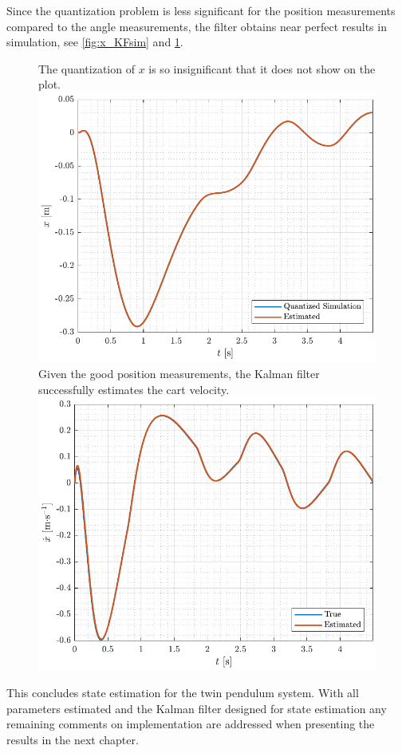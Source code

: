 %
Since the quantization problem is less significant for the position measurements compared to the angle measurements, the filter obtains near perfect results in simulation, see \autoref{fig:x_KFsim} and \ref{fig:xDot_KFsim}.
%
\begin{figure}[H]
  \hspace{-10pt}
  \captionbox
  {
    The quantization of $x$ is so insignificant that it does not show on the plot.
    \label{fig:x_KFsim}
  }
  {
    \hspace{-1cm}
    \includegraphics[width=.5\textwidth]{figures/x_KFsim}
  }
  \hspace{20pt}
  \captionbox 
  {
    Given the good position measurements, the Kalman filter successfully estimates the cart velocity.
    \label{fig:xDot_KFsim}
  }
  {
    \hspace{-1cm}
    \includegraphics[width=.5\textwidth]{figures/xDot_KFsim}
  }  
\end{figure}
%
%
%
%
%
%
%
%
%
%
This concludes state estimation for the twin pendulum system. With all parameters estimated and the Kalman filter designed for state estimation any remaining comments on implementation are addressed when presenting the results in the next chapter.